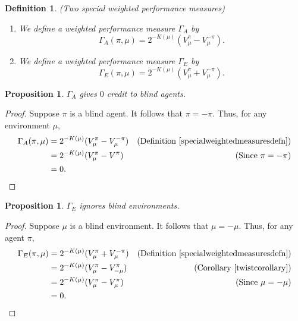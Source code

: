\documentclass{article}
\newtheorem{definition}[theorem]{Definition}
\newtheorem{proposition}[theorem]{Proposition}
\begin{document}
\begin{definition}
\label{specialweightedmeasuresdefn}
(Two special weighted performance measures)
    \begin{enumerate}
        \item
        We define a weighted performance measure $\Gamma_A$ by
        \[
            \Gamma_A(\pi,\mu) = 2^{-K(\mu)}(V^\pi_\mu - V^{-\pi}_\mu).
        \]
        \item
        We define a weighted performance measure $\Gamma_E$ by
        \[
            \Gamma_E(\pi,\mu) = 2^{-K(\mu)}(V^\pi_\mu + V^{-\pi}_\mu).
        \]
    \end{enumerate}
\end{definition}

\begin{proposition}
    $\Gamma_A$ gives $0$ credit to blind agents.
\end{proposition}

\begin{proof}
    Suppose $\pi$ is a blind agent. It follows that $\pi=-\pi$.
    Thus, for any environment $\mu$,
    \begin{align*}
        \Gamma_A(\pi,\mu) &= 2^{-K(\mu)}(V^\pi_\mu - V^{-\pi}_\mu)
            &\mbox{(Definition \ref{specialweightedmeasuresdefn})}\\
          &= 2^{-K(\mu)}(V^\pi_\mu - V^\pi)
            &\mbox{(Since $\pi=-\pi$)}\\
          &= 0.
    \end{align*}
\end{proof}

\begin{proposition}
    $\Gamma_E$ ignores blind environments.
\end{proposition}

\begin{proof}
    Suppose $\mu$ is a blind environment. It follows that $\mu=-\mu$.
    Thus, for any agent $\pi$,
    \begin{align*}
        \Gamma_E(\pi,\mu) &= 2^{-K(\mu)}(V^\pi_\mu + V^{-\pi}_\mu)
            &\mbox{(Definition \ref{specialweightedmeasuresdefn})}\\
          &= 2^{-K(\mu)}(V^\pi_\mu - V^\pi_{-\mu})
            &\mbox{(Corollary \ref{twistcorollary})}\\
          &= 2^{-K(\mu)}(V^\pi_\mu - V^\pi_\mu)
            &\mbox{(Since $\mu=-\mu$)}\\
          &= 0.
    \end{align*}
\end{proof}



\end{document}
